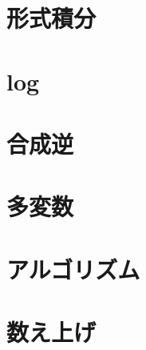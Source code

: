 \documentclass{jsarticle}
\theoremstyle{definition}
\begin{document}
\section{形式積分}
\section{log}
\section{合成逆}
\section{多変数}
\section{アルゴリズム}
\section{数え上げ}
\end{document}
